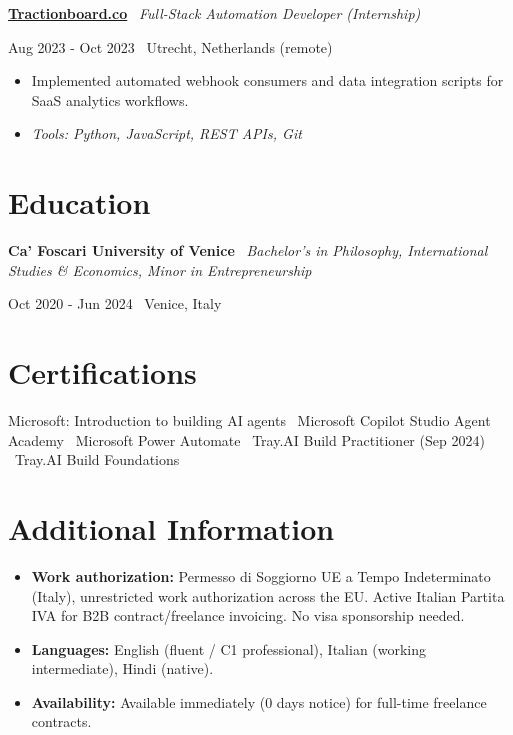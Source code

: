 \documentclass[a4paper,10pt]{article}
\newcommand{\role}[4]{%
  \vspace{2pt}\noindent
  \begin{minipage}[t]{0.70\textwidth}\raggedright\textbf{#1} \textbullet\ \textit{#3}\end{minipage}%
  \hfill
  \begin{minipage}[t]{0.28\textwidth}\raggedleft\footnotesize\color{gray}#2 \textbullet\ #4\end{minipage}%
  \vspace{1pt}%
}
\begin{document}
\role{\href{https://tractionboard.co}{Tractionboard.co}}{Aug 2023 - Oct 2023}{Full-Stack Automation Developer (Internship)}{Utrecht, Netherlands (remote)}
\begin{itemize}
  \item Implemented automated webhook consumers and data integration scripts for SaaS analytics workflows.
  \item \textit{Tools: Python, JavaScript, REST APIs, Git}
\end{itemize}

\section{Education}
\role{Ca' Foscari University of Venice}{Oct 2020 - Jun 2024}{Bachelor's in Philosophy, International Studies \& Economics, Minor in Entrepreneurship}{Venice, Italy}

\section{Certifications}
Microsoft: Introduction to building AI agents \textbullet\ Microsoft Copilot Studio Agent Academy \textbullet\ Microsoft Power Automate \textbullet\ Tray.AI Build Practitioner (Sep 2024) \textbullet\ Tray.AI Build Foundations

\section{Additional Information}
\begin{itemize}
  \item \textbf{Work authorization:} Permesso di Soggiorno UE a Tempo Indeterminato (Italy), unrestricted work authorization across the EU. Active Italian Partita IVA for B2B contract/freelance invoicing. No visa sponsorship needed.
  \item \textbf{Languages:} English (fluent / C1 professional), Italian (working intermediate), Hindi (native).
  \item \textbf{Availability:} Available immediately (0 days notice) for full-time freelance contracts.
\end{itemize}

\end{document}
